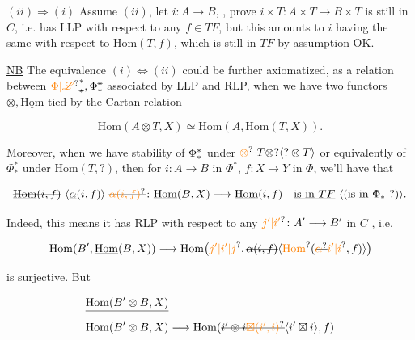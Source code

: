 $(ii)\Longrightarrow(i)$ Assume $(ii)$, let $i\colon A\longrightarrow B$,  , prove $i\times T\colon A\times T\longrightarrow B\times T$ is still in $C$, i.e. has  LLP with respect to any $f\in TF$, but this amounts to $i$ having the same with respect to $\mathrm{Hom}(T,f)$, which is still in $TF$ by assumption OK.

 \uline{NB} The equivalence $(i)\Leftrightarrow(ii)$ could be further axiomatized, as a relation between $\unsure{\Phi|\mathscr L}^{*}_{\deleted{*}},\Phi^{\deleted{*}}_{*}$ associated by LLP and RLP, when we have two functors $\otimes,\underline{\mathrm{Hom}}$ tied by the Cartan relation

\[
\mathrm{Hom}(A\otimes T,X)\simeq\mathrm{Hom}(A,\underline{\mathrm{Hom}}(T,X)).
\]


Moreover, when we have stability of $\Phi_{\deleted{*}}^{*}$ under $\deleted{\unsure{\otimes}\ T\otimes ?}\inserted{?\otimes T}$  or equivalently of $\Phi^{*}_{*}$ under $\underline{\mathrm{Hom}}(T,?)$, then for $i\colon A\longrightarrow B$ in $\Phi^{*}$, $f\colon X\longrightarrow Y$ in $\Phi$, we'll have that

\[
\deleted{\underline{\mathrm{Hom}}(i,f)}\ \inserted{\underline{\alpha}(i,f)}\ \deleted{\unsure{\alpha(i,f)}}\colon
\underline{\mathrm{Hom}}(B,X)\longrightarrow\underline{\mathrm{Hom}}(i,f)
\quad\underline{\text{is in }TF}\ \text{\inserted{(is in $\Phi_{*}$ ?)}}.
\]

Indeed, this means it has RLP with respect to any $\unsure{j'|i'}\colon A'\longrightarrow B'$ in $C$ \inserted{[$\Phi^{*}$]}, i.e.

\[
\mathrm{Hom}(B',\underline{\mathrm{Hom}}(B,X))\longrightarrow
\mathrm{Hom}\bigl(\unsure{j'|i'|j},\deleted{\alpha(i,f)}\inserted{\unsure{\mathrm{Hom}}(\deleted{\unsure{\alpha}}\unsure{i'|i},f)}\bigr)
\]

is surjective. But  

\[
\begin{aligned}
&\deleted{\mathrm{Hom}(B'\otimes B,X)}\\
&\mathrm{Hom}(B'\otimes B,X)\longrightarrow\mathrm{Hom}(\deleted{i'\otimes i}\deleted{\unsure{\boxtimes(i',i)}}\inserted{i'\boxtimes i},f)
\end{aligned}
\]

